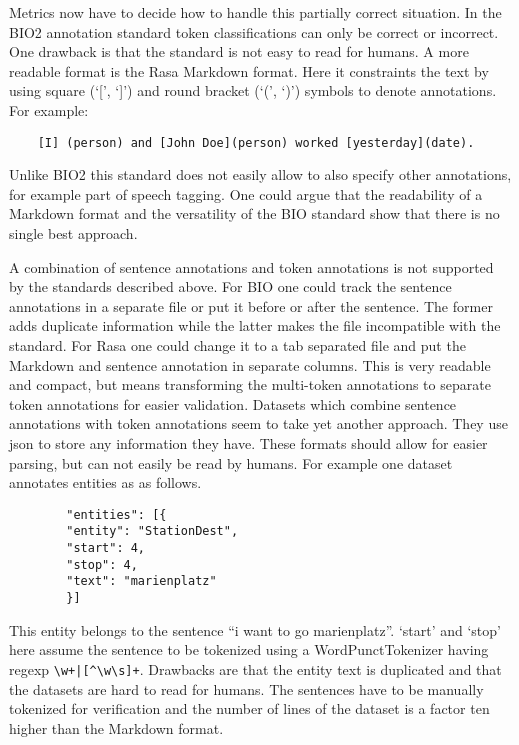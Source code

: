 Metrics now have to decide how to handle this partially correct situation.
In the BIO2 annotation standard token classifications can only be correct or incorrect.
One drawback is that the standard is not easy to read for humans.
A more readable format is the Rasa Markdown format.
Here it constraints the text by using square (`[', `]') and round bracket (`(', `)') symbols to denote annotations.
For example:
\begin{center}
    \begin{verbatim}
    [I] (person) and [John Doe](person) worked [yesterday](date).
    \end{verbatim}
\end{center}
Unlike BIO2 this standard does not easily allow to also specify other annotations, for example part of speech tagging.
One could argue that the readability of a Markdown format and the versatility of the BIO standard show that there is no single best approach.

A combination of sentence annotations and token annotations is not supported by the standards described above.
For BIO one could track the sentence annotations in a separate file or put it before or after the sentence.
The former adds duplicate information while the latter makes the file incompatible with the standard.
For Rasa one could change it to a tab separated file and put the Markdown and sentence annotation in separate columns.
This is very readable and compact, but means transforming the multi-token annotations to separate token annotations for easier validation.
Datasets which combine sentence annotations with token annotations seem to take yet another approach.
They use json to store any information they have.
These formats should allow for easier parsing, but can not easily be read by humans.
For example one dataset annotates entities as as follows.
\begin{center}
    \begin{verbatim}
        "entities": [{
        "entity": "StationDest",
        "start": 4,
        "stop": 4,
        "text": "marienplatz"
        }]
    \end{verbatim}
\end{center}
This entity belongs to the sentence ``i want to go marienplatz''.
`start' and `stop' here assume the sentence to be tokenized using a WordPunctTokenizer having regexp \verb/\w+|[^\w\s]+/.
Drawbacks are that the entity text is duplicated and that the datasets are hard to read for humans.
The sentences have to be manually tokenized for verification and the number of lines of the dataset is a factor ten higher than the Markdown format.

